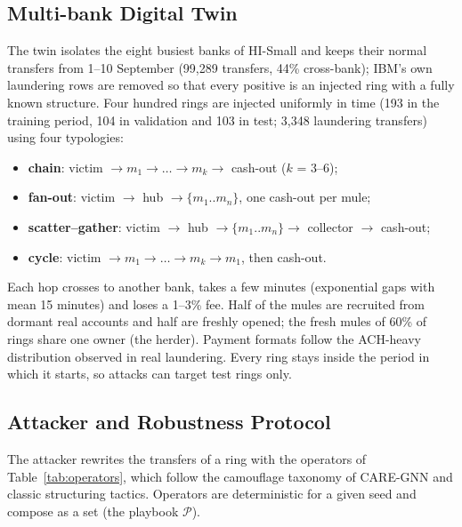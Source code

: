 \subsection{Multi-bank Digital Twin}
The twin isolates the eight busiest banks of HI-Small and keeps their normal transfers from 1--10 September (99,289 transfers, 44\% cross-bank); IBM's own laundering rows are removed so that every positive is an injected ring with a fully known structure. Four hundred rings are injected uniformly in time (193 in the training period, 104 in validation and 103 in test; 3,348 laundering transfers) using four typologies:
\begin{itemize}
    \item \textbf{chain}: victim $\rightarrow m_1 \rightarrow \dots \rightarrow m_k \rightarrow$ cash-out ($k$ = 3--6);
    \item \textbf{fan-out}: victim $\rightarrow$ hub $\rightarrow \{m_1..m_n\}$, one cash-out per mule;
    \item \textbf{scatter--gather}: victim $\rightarrow$ hub $\rightarrow \{m_1..m_n\} \rightarrow$ collector $\rightarrow$ cash-out;
    \item \textbf{cycle}: victim $\rightarrow m_1 \rightarrow \dots \rightarrow m_k \rightarrow m_1$, then cash-out.
\end{itemize}
Each hop crosses to another bank, takes a few minutes (exponential gaps with mean 15 minutes) and loses a 1--3\% fee. Half of the mules are recruited from dormant real accounts and half are freshly opened; the fresh mules of 60\% of rings share one owner (the herder). Payment formats follow the ACH-heavy distribution observed in real laundering. Every ring stays inside the period in which it starts, so attacks can target test rings only.

\subsection{Attacker and Robustness Protocol}
The attacker rewrites the transfers of a ring with the operators of Table~\ref{tab:operators}, which follow the camouflage taxonomy of CARE-GNN \cite{dou2020enhancing} and classic structuring tactics. Operators are deterministic for a given seed and compose as a set (the playbook $\mathcal{P}$).

